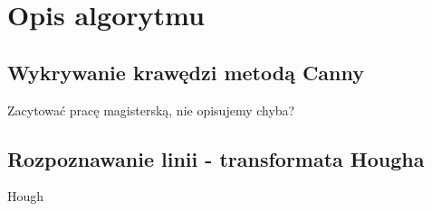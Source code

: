 \section{Opis algorytmu}



\subsection{Wykrywanie krawędzi metodą Canny}

Zacytować pracę magisterską, nie opisujemy chyba?

\subsection{Rozpoznawanie linii - transformata Hougha}

Hough

%  

%

%


